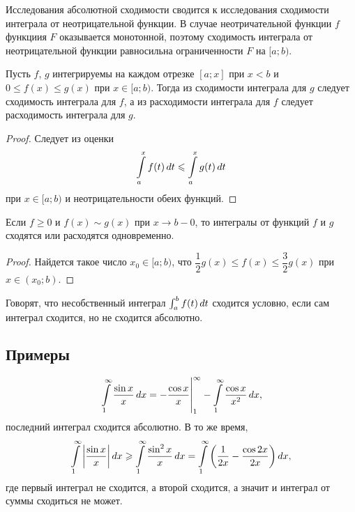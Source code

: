 \documentclass[a4paper]{article}
\theoremstyle{named}
\renewcommand{\int}{\intop}
\begin{document}
        \begin{remark*}
            Исследования абсолютной сходимости сводится к исследования сходимости интеграла от неотрицательной функции. В случае неотричательной функции $f$ функциия $F$ оказывается монотонной, поэтому сходимость интеграла от неотрицательной функции равносильна ограниченности $F$ на $[a; b)$.
        \end{remark*}

        \begin{proposal*}
            Пусть $f$, $g$ интегрируемы на каждом отрезке $[a; x]$ при $x < b$ и $0 \leq f(x) \leq g(x)$ при $x \in [a; b)$. Тогда из сходимости интеграла для $g$ следует сходимость интеграла для $f$, а из расходимости интеграла для $f$ следует расходимость интеграла для $g$.
        \end{proposal*}

        \begin{proof}
            Следует из оценки
            \begin{equation*}
                \int_a^x f(t) \dd t \leq \int_a^x g(t) \dd t
            \end{equation*}
            при $x \in [a; b)$ и неотрицательности обеих функций.
        \end{proof}

        \begin{consequence*}
            Если $f \geq 0$ и $f(x) \sim g(x)$ при $x \to b - 0$, то интегралы от функций $f$ и $g$ сходятся или расходятся одновременно.
        \end{consequence*}

        \begin{proof}
            Найдется такое число $x_0 \in [a; b)$, что $\dfrac{1}{2}g(x) \leq f(x) \leq \dfrac{3}{2}g(x)$ при $x \in (x_0; b)$.
        \end{proof}

        \begin{definition*}
            Говорят, что несобственный интеграл $\int_a^b f(t) \dd t$ сходится условно, если сам интеграл сходится, но не сходится абсолютно.
        \end{definition*}

        \subsection{Примеры}

        \begin{equation*}
            \left.\int_1^{\infty} \dfrac{\sin x}{x} \dd x = - \dfrac{\cos x}{x} \right|_1^{\infty} - \int_1^{\infty} \dfrac{\cos x}{x^2} \dd x,
        \end{equation*}
        последний интеграл сходится абсолютно. В то же время,
        \begin{equation*}
            \int_1^{\infty} \left|\dfrac{\sin x}{x}\right| \dd x \geq \int_1^{\infty} \dfrac{\sin^2 x}{x} \dd x = \int_1^{\infty} \left( \dfrac{1}{2x} - \dfrac{\cos 2x}{2x} \right)\dd x,
        \end{equation*}
        где первый интеграл не сходится, а второй сходится, а значит и интеграл от суммы сходиться не может.
\end{document}
